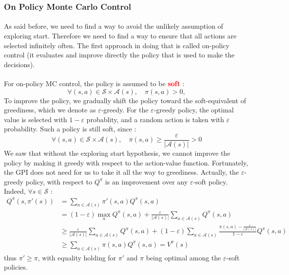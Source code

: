 \documentclass[a4paper]{article}
\begin{document}
{{{				\subsubsection{On Policy Monte Carlo Control}
				{
					\paragraph{} As said before, we need to find a way to avoid the unlikely assumption of exploring start. Therefore we need to find a way to ensure that all actions are selected infinitely often. The first approach in doing that is called on-policy control (it evaluates and improve directly the policy that is used to make the decisions). 
					
					\paragraph{} For on-policy MC control, the policy is assumed to be \textbf{\textcolor{red}{soft}} : 
					\begin{equation}
						 \forall (s,a)\in\mathcal{S}\times \mathcal{A}(s), \quad \pi(s,a) > 0, 
					\end{equation}
					To improve the policy, we gradually shift the policy toward the soft-equivalent of greediness, which we denote as $\varepsilon$-greedy. \newline
					For the $\varepsilon$-greedy policy, the optimal value is selected with $1 - \varepsilon$ probablity, and a random action is taken with $\varepsilon$ probability. Such a policy is still soft, since : 
					\begin{equation}
						 \forall (s,a)\in\mathcal{S}\times \mathcal{A}(s), \quad \pi(s,a) \geq \frac{\varepsilon}{\vert \mathcal{A}(s) \vert } > 0
					\end{equation}
					We saw that without the exploring start hypothesis, we cannot improve the policy by making it greedy with respect to the action-value function. Fortunately, the GPI does not need for us to take it all the way to greediness. Actually, the $\varepsilon$-greedy policy, with respect to $Q^\pi$ is an improvement over any $\varepsilon$-soft policy. Indeed, $\forall s \in\mathcal{S}$ :
					\begin{equation}
						\begin{aligned}
							Q^\pi(s,\pi'(s)) &= \sum_{a\in\mathcal{A}(s)} \pi'(s,a)Q^\pi(s,a)\\
									       &= (1-\varepsilon)\max_a Q^\pi(s,a) + \frac{\varepsilon}{\vert \mathcal{A}(s) \vert }\sum_{a\in\mathcal{A}(s)} Q^\pi(s,a) \\
									       &\geq \frac{\varepsilon}{\vert \mathcal{A}(s) \vert }\sum_{a\in\mathcal{A}(s)} Q^\pi(s,a) + (1-\varepsilon)\sum_{a\in\mathcal{A}(s)} \frac{\pi(s,a) - \frac{\varepsilon}{\vert \mathcal{A}(s)\vert }}{1 - \varepsilon}Q^\pi(s,a) \\
									       &\geq \sum_{a\in\mathcal{A}(s)} \pi(s,a)Q^\pi(s,a) = V^\pi(s)
						\end{aligned}
					\end{equation}
					thus $\pi' \geq \pi$, with equality holding for $\pi'$ and $\pi$ being optimal among the $\varepsilon$-soft policies. 
					
}}}}
\end{document}
